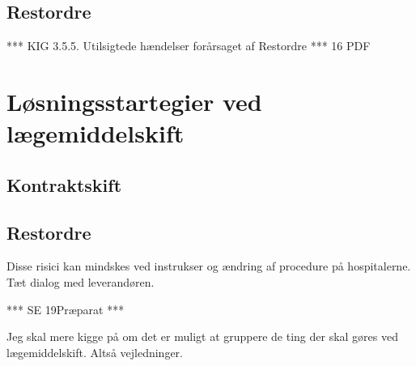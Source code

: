 \subsection{Restordre}

*** KIG 3.5.5. Utilsigtede hændelser forårsaget af Restordre *** 16 PDF

\section{Løsningsstartegier ved lægemiddelskift}

\subsection{Kontraktskift}

\subsection{Restordre}
Disse risici kan mindskes ved instrukser og ændring af procedure på hospitalerne.
Tæt dialog med leverandøren.

*** SE 19Præparat ***

Jeg skal mere kigge på om det er muligt at gruppere de ting der skal gøres ved lægemiddelskift. Altså vejledninger. 